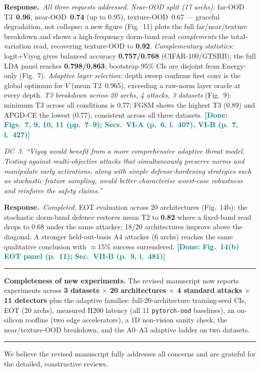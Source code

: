 \documentclass[10pt,letterpaper,journal]{IEEEtran}
\newcommand{\rc}[1]{\smallskip\noindent\textit{\textcolor{black!75}{#1}}\par\smallskip}
\newcommand{\rr}{\noindent\textbf{Response.}~}
\newcommand{\done}[1]{\textcolor{teal}{\textbf{[Done: #1]}}}
\begin{document}
\rr \emph{All three requests addressed.}
\emph{Near-OOD split (17 archs):} far-OOD T3~\textbf{0.96}, near-OOD~\textbf{0.74}
(up to 0.95), texture-OOD~0.67 --- graceful degradation, not collapse; a new
figure (Fig.~11) plots the full far/near/texture breakdown and shows a
high-frequency dorm-band read \emph{complements} the total-variation read,
recovering texture-OOD to \textbf{0.92}.
\emph{Complementary statistics:} logit+Viyog gives balanced accuracy
\textbf{0.757/0.768} (CIFAR-100/GTSRB); the full LDA panel reaches
\textbf{0.798/0.863}; bootstrap 95\% CIs are disjoint from Energy-only (Fig.~7).
\emph{Adaptive layer selection:} depth sweep confirms first conv is the global
optimum for $V$ (mean T2~0.965), exceeding a raw-norm layer oracle at every depth.
\emph{T3 breakdown across 20 archs, 4 attacks, 3 datasets} (Fig.~9): minimum T3
across all conditions is 0.77; FGSM shows the highest T3 (0.89) and APGD-CE the
lowest (0.77), consistent across all three datasets.
\done{Figs.~7, 9, 10, 11 (pp.~7--9); Secs.~VI-A (p.~6, l.~407), VI-B (p.~7, l.~427)}

\rc{DC~3. ``Viyog would benefit from a more comprehensive adaptive threat model.
Testing against multi-objective attacks that simultaneously preserve norms and
manipulate early activations, along with simple defense-hardening strategies such as
stochastic feature sampling, would better characterise worst-case robustness and
reinforce the safety claims.''}

\rr \emph{Completed.} EOT evaluation across 20 architectures (Fig.~14b):
the stochastic dorm-band defence restores mean T2 to \textbf{0.82} where a
fixed-band read drops to 0.68 under the same attacker; 18/20 architectures
improve above the diagonal.
A stronger held-out-basis A4 attacker (6 archs) reaches the same qualitative
conclusion with $\approx$15\% success surrendered.
\done{Fig.~14(b) EOT panel (p.~11); Sec.~VII-B (p.~9, l.~481)}

\noindent\rule{\columnwidth}{0.4pt}

\noindent\textbf{Completeness of new experiments.} The revised manuscript now
reports experiments across \textbf{3 datasets $\times$ 20 architectures $\times$
4 standard attacks $\times$ 11 detectors} plus the adaptive families:
full-20-architecture training-seed CIs, EOT (20 archs), measured H200 latency
(all 11 \texttt{pytorch-ood} baselines), an on-silicon roofline (two edge
accelerators), a 1D non-vision sanity check, the near/texture-OOD breakdown, and
the A0--A3 adaptive ladder on two datasets.

\noindent\rule{\columnwidth}{0.4pt}

\vspace{3pt}
\noindent We believe the revised manuscript fully addresses all concerns and are
grateful for the detailed, constructive reviews.

\balance
\end{document}
